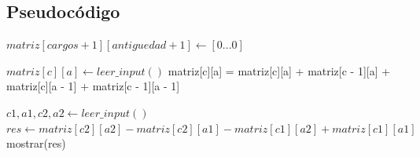 \subsection {Pseudocódigo}

\begin{algorithmic}

	\State $matriz[cargos + 1][antiguedad + 1] \gets [0...0]$ 

			\State $matriz[c][a] \gets leer\_input()$
			\State matriz[c][a] = matriz[c][a] + matriz[c - 1][a] + matriz[c][a - 1] + matriz[c - 1][a - 1]
		\EndFor
	\EndFor

		\State $c1, a1, c2, a2 \gets leer\_input()$
		\State $res \gets matriz[c2][a2] - matriz[c2][a1] - matriz[c1][a2] + matriz[c1][a1]$
		\State mostrar(res)
	\EndFor

\end{algorithmic}